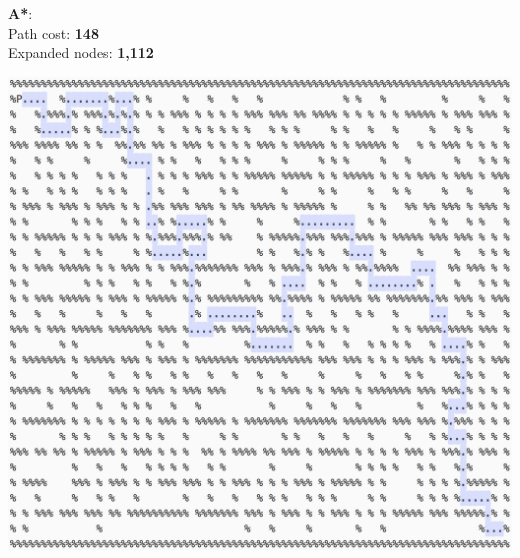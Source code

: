 \documentclass[11pt]{article}
\begin{document}
\textbf{A*}:\\
Path cost: \textbf{148}\\
Expanded nodes: \textbf{1,112}
\begin{center}
\includegraphics[scale=0.6]{big-maze/a-star.png}
\end{center}
\pagebreak
\end{document}
